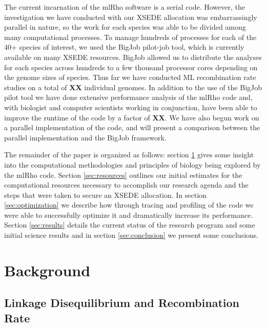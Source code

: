 \documentclass{sig-alternate}
\begin{document}
The current incarnation of the mlRho software is a serial code. However, the investigation we have conducted
with our XSEDE allocation was embarrassingly parallel in nature, so the work for each species was able to be
divided among many computational processes. To manage hundreds of processes for each of the 40+ species of
interest, we used the BigJob pilot-job tool, which is currently available on many XSEDE resources. BigJob
allowed us to distribute the analyses for each species across hundreds to a few thousand processor cores
depending on the genome sizes of species. Thus far we have conducted ML recombination rate studies on a total
of {\bf XX} individual genomes. In addition to the use of the BigJob pilot tool we have done extensive performance
analysis of the mlRho code and, with biologist and computer scientists working in conjunction, have been able
to improve the runtime of the code by a factor of {\bf XX}. We have also begun work on a parallel
implementation of the code, and will present a comparison between the parallel implementation and the BigJob
framework.

The remainder of the paper is organized as follows: section \ref{sec:background} gives some insight into the
computational methodologies and principles of biology being explored by the mlRho code. Section
\ref{sec:resources} outlines our initial estimates for the computational resources necessary to accomplish our
research agenda and the steps that were taken to secure an XSEDE allocation. In section \ref{sec:optimization}
we describe how through tracing and profiling of the code we were able to successfully optimize it and
dramatically increase its performance. Section \ref{sec:results} details the current status of the research
program and some initial science results and in section \ref{sec:conclusion} we present some conclusions.


\section{Background}\label{sec:background}


\subsection{Linkage Disequilibrium and Recombination Rate}\label{sec:LD}
\end{document}

